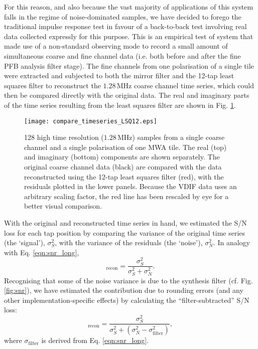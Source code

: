 \documentclass{pasa}%
\begin{document}
For this reason, and also because the vast majority of applications of this system falls in the regime of noise-dominated samples, we have decided to forego the traditional impulse response test in favour of a back-to-back test involving real data collected expressly for this purpose.
This is an empirical test of system that made use of a non-standard observing mode to record a small amount of simultaneous coarse and fine channel data (i.e. both before and after the fine PFB analysis filter stage).
The fine channels from one polarisation of a single tile were extracted and subjected to both the mirror filter and the 12-tap least squares filter to reconstruct the $1.28\,$MHz coarse channel time series, which could then be compared directly with the original data.
The real and imaginary parts of the time series resulting from the least squares filter are shown in Fig. \ref{fig:compare_timeseries}.
\begin{figure}
    \centering
    \texttt{[image: compare\_timeseries\_LSQ12.eps]}
    \caption{128 high time resolution ($1.28\,$MHz) samples from a single coarse channel and a single polarisation of one MWA tile. The real (top) and imaginary (bottom) components are shown separately. The original coarse channel data (black) are compared with the data reconstructed using the 12-tap least squares filter (red), with the residuals plotted in the lower panels. Because the VDIF data uses an arbitrary scaling factor, the red line has been rescaled by eye for a better visual comparison.}
    \label{fig:compare_timeseries}
\end{figure}

With the original and reconstructed time series in hand, we estimated the S/N loss for each tap position by comparing the variance of the original time series (the `signal'), $\sigma_S^2$, with the variance of the residuals (the `noise'), $\sigma_N^2$.
In analogy with Eq. \eqref{eqn:snr_long},
\begin{equation}
    [\text{S/N}]_\text{recon}
      = \frac{\sigma_S^2}{\sigma_S^2 + \sigma_N^2}.
    \label{eqn:snr_measured}
\end{equation}
Recognising that some of the noise variance is due to the synthesis filter (cf. Fig. \ref{fig:snr}), we have estimated the contribution due to rounding errors (and any other implementation-specific effects) by calculating the ``filter-subtracted'' S/N loss:
\begin{equation}
    [\text{S/N}]_\text{recon}
      = \frac{\sigma_S^2}{\sigma_S^2 + (\sigma_N^2 - \sigma_\text{filter}^2)},
    \label{eqn:snr_filter_subtracted}
\end{equation}
where $\sigma_\text{filter}$ is derived from Eq. \eqref{eqn:snr_long}.
\end{document}
